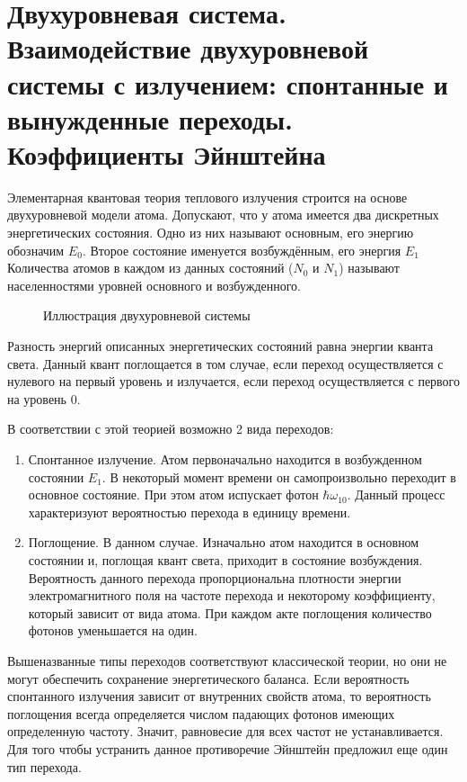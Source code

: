 
\section{Двухуровневая система. Взаимодействие двухуровневой системы с излучением: спонтанные и вынужденные переходы. Коэффициенты Эйнштейна}

Элементарная квантовая теория теплового излучения строится на основе двухуровневой модели атома. Допускают, что у атома имеется два дискретных энергетических состояния. Одно из них называют основным, его энергию обозначим $E_0$. Второе состояние именуется возбуждённым, его энергия $E_1$ Количества атомов в каждом из данных состояний ($N_0$ и $N_1$) называют населенностями уровней основного и возбужденного.

\begin{figure}[H]\label{qr}
	\caption{Иллюстрация двухуровневой системы}
	\label{fig:image}
\end{figure}

Разность энергий описанных энергетических состояний равна энергии кванта света. Данный квант поглощается в том случае, если переход осуществляется с нулевого на первый уровень и излучается, если переход осуществляется с первого на уровень 0.


В соответствии с этой теорией возможно 2 вида переходов:
\begin{enumerate}
	
	\item Спонтанное излучение. Атом первоначально находится в возбужденном состоянии $E_1$. В некоторый момент времени он самопроизвольно переходит в основное состояние. При этом атом испускает фотон $\hbar \omega_{10}$. Данный процесс характеризуют вероятностью перехода в единицу времени.
	
	\item Поглощение. В данном случае. Изначально атом находится в основном состоянии и, поглощая квант света, приходит в состояние возбуждения. Вероятность данного перехода пропорциональна плотности энергии электромагнитного поля на частоте перехода и некоторому коэффициенту, который зависит от вида атома. При каждом акте поглощения количество фотонов уменьшается на один.
	
\end{enumerate}

Вышеназванные типы переходов соответствуют классической теории, но они не могут обеспечить сохранение энергетического баланса. Если вероятность спонтанного излучения зависит от внутренних свойств атома, то вероятность поглощения всегда определяется числом падающих фотонов имеющих определенную частоту. Значит, равновесие для всех частот не устанавливается. Для того чтобы устранить данное противоречие Эйнштейн предложил еще один тип перехода.


